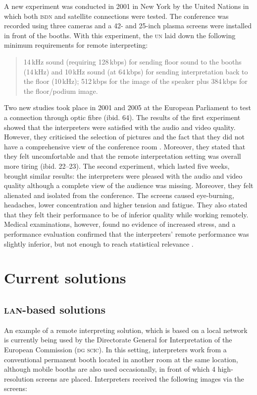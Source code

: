 \documentclass[output=paper]{langsci/langscibook}
\begin{document}
A new experiment was conducted in 2001 in New York by the United Nations in which both \textsc{isdn} and satellite connections were tested. The conference was recorded using three cameras and a 42- and 25-inch plasma screens were installed in front of the booths. With this experiment, the \textsc{un} laid down the following minimum requirements for remote interpreting:

\begin{quote}
14\,kHz sound (requiring 128\,kbps) for sending floor sound to the booths (14\,kHz) and 10\,kHz sound (at 64\,kbps) for sending interpretation back to the floor (10\,kHz); 512\,kbps for the image of the speaker plus 384\,kbps for the floor/podium image. \citep[63]{Mouzourakis2006}
\end{quote}

Two new studies took place in 2001 and 2005 at the European Parliament to test a connection through optic fibre (ibid. 64). The results of the first experiment showed that the interpreters were satisfied with the audio and video quality. However, they criticised the selection of pictures and the fact that they did not have a comprehensive view of the conference room \citep[19--21]{Europarl2001}. Moreover, they stated that they felt uncomfortable and that the remote interpretation setting was overall more tiring (ibid. 22--23). The second experiment, which lasted five weeks, brought similar results: the interpreters were pleased with the audio and video quality although a complete view of the audience was missing. Moreover, they felt alienated and isolated from the conference. The screens caused eye-burning, headaches, lower concentration and higher tension and fatigue. They also stated that they felt their performance to be of inferior quality while working remotely. Medical examinations, however, found no evidence of increased stress, and a performance evaluation confirmed that the interpreters’ remote performance was slightly inferior, but not enough to reach statistical relevance \citep[225--243]{Roziner2010}.

\section{Current solutions}
\label{sec:ziegler:04}
\subsection{\textsc{lan}-based solutions} 
\label{sub:ziegler:4.1}
An example of a remote interpreting solution, which is based on a local network is currently being used by the Directorate General for Interpretation of the European Commission (\textsc{dg scic}). In this setting, interpreters work from a conventional permanent booth located in another room at the same location, although mobile booths are also used occasionally, in front of which 4 high-resolution screens are placed. Interpreters received the following images via the screens:
\end{document}
